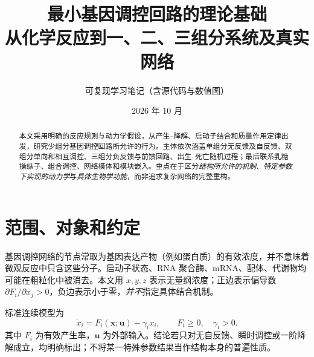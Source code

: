 \documentclass[11pt,a4paper,UTF8,fontset=fandol]{ctexart}
\title{\bfseries 最小基因调控回路的理论基础\\[4pt]\large 从化学反应到一、二、三组分系统及真实网络}
\author{可复现学习笔记（含源代码与数值图）}
\date{2026 年 10 月}
\begin{document}
\maketitle
\begin{abstract}
本文采用明确的反应规则与动力学假设，从产生--降解、启动子结合和质量作用定律出发，研究少组分基因调控回路所允许的行为。主体依次涵盖单组分无反馈及自反馈、双组分单向和相互调控、三组分负反馈与前馈回路、出生--死亡随机过程；最后联系乳糖操纵子、组合调控、网络模体和模块嵌入。重点在于区分\emph{结构所允许的机制}、\emph{特定参数下实现的动力学}与\emph{具体生物学功能}，而非追求复杂网络的完整重构。
\end{abstract}
\newpage\tableofcontents\newpage
\section{范围、对象和约定}
基因调控网络的节点常取为基因表达产物（例如蛋白质）的有效浓度，并不意味着微观反应中只含这些分子。启动子状态、RNA 聚合酶、mRNA、配体、代谢物均可能在粗粒化中被消去。本文用 $x,y,z$ 表示无量纲浓度；正边表示偏导数 $\partial F_i/\partial x_j>0$，负边表示小于零，\emph{并不}指定具体结合机制。

标准连续模型为
\begin{equation}\dot x_i=F_i(\bm{x};\bm{u})-\gamma_i x_i,\qquad F_i\geq0,\quad\gamma_i>0.\end{equation}
其中 $F_i$ 为有效产生率，$\bm u$ 为外部输入。结论若只对无自反馈、瞬时调控或一阶降解成立，均明确标出；不将某一特殊参数结果当作结构本身的普遍性质。
\end{document}
